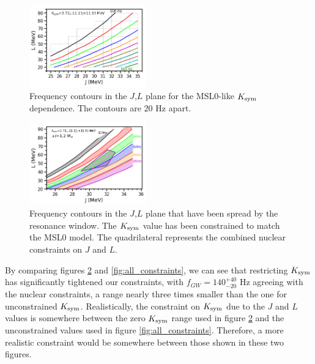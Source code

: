 \documentclass[fleqn,usenatbib]{mnras}
\begin{document}
\begin{figure}
\centering
\includegraphics[width=0.45\textwidth,angle=0]{MSL0_contours_20gap}
\caption{Frequency contours in the $J$,$L$ plane for the MSL0-like $K_{\rm sym}$ dependence. The contours are $20$ Hz apart.}
\label{fig:MSL0_contours_20gap}
\end{figure}

\begin{figure}
\centering
\includegraphics[width=0.45\textwidth,angle=0]{MSL0_shaded_constraints}
\caption{Frequency contours in the $J$,$L$ plane that have been spread by the resonance window. The $K_{\rm sym}$ value has been constrained to match the MSL0 model. The quadrilateral represents the combined nuclear constraints on $J$ and $L$.}
\label{fig:MSL0_shaded_constraints}
\end{figure}

\hspace{\parindent}By comparing figures \ref{fig:MSL0_shaded_constraints} and \ref{fig:all_constraints}, we can see that restricting $K_{\rm sym}$ has significantly tightened our constraints, with $f_{GW}=140^{+40}_{-20}$ Hz agreeing with the nuclear constraints, a range nearly three times smaller than the one for unconstrained $K_{\rm sym}$. Realistically, the constraint on $K_{\rm sym}$ due to the $J$ and $L$ values is somewhere between the zero $K_{\rm sym}$ range used in figure \ref{fig:MSL0_shaded_constraints} and the unconstrained values used in figure \ref{fig:all_constraints}. Therefore, a more realistic constraint would be somewhere between those shown in these two figures.
\end{document}
